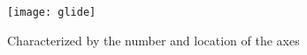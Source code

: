 \begin{figure}
\centering
\texttt{[image: glide]}
\caption{Characterized by the number and location of the axes}
\label{glide}
\end{figure}